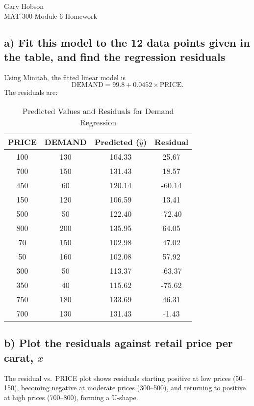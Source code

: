 \documentclass[12pt,notitlepage]{article}
\begin{document}
Gary Hobson\\
MAT 300 Module 6 Homework

\subsection*{a) Fit this model to the 12 data points given in the table, and find the regression residuals}

Using Minitab, the fitted linear model is 
\[ \text{DEMAND} = 99.8 + 0.0452 \times \text{PRICE}. \]
The residuals are:

\begin{table}[h]
    \centering
    \small %
    \setlength{\tabcolsep}{4pt} %
    \caption{Predicted Values and Residuals for Demand Regression}
    \label{tab:demand_residuals}
    \begin{tabular}{|c|c|c|c|}
        \hline
        \textbf{PRICE} & \textbf{DEMAND} & \textbf{Predicted (\(\hat{y}\))} & \textbf{Residual} \\
        \hline
        100 & 130 & 104.33 & 25.67 \\
        700 & 150 & 131.43 & 18.57 \\
        450 & 60 & 120.14 & -60.14 \\
        150 & 120 & 106.59 & 13.41 \\
        500 & 50 & 122.40 & -72.40 \\
        800 & 200 & 135.95 & 64.05 \\
        70 & 150 & 102.98 & 47.02 \\
        50 & 160 & 102.08 & 57.92 \\
        300 & 50 & 113.37 & -63.37 \\
        350 & 40 & 115.62 & -75.62 \\
        750 & 180 & 133.69 & 46.31 \\
        700 & 130 & 131.43 & -1.43 \\
        \hline
    \end{tabular}
\end{table}

\subsection*{b) Plot the residuals against retail price per carat, \( x \)}

The residual vs.\ PRICE plot shows residuals starting positive at low prices (50--150), becoming negative at moderate prices (300--500), and returning to positive at high prices (700--800), forming a U-shape.
\end{document}
